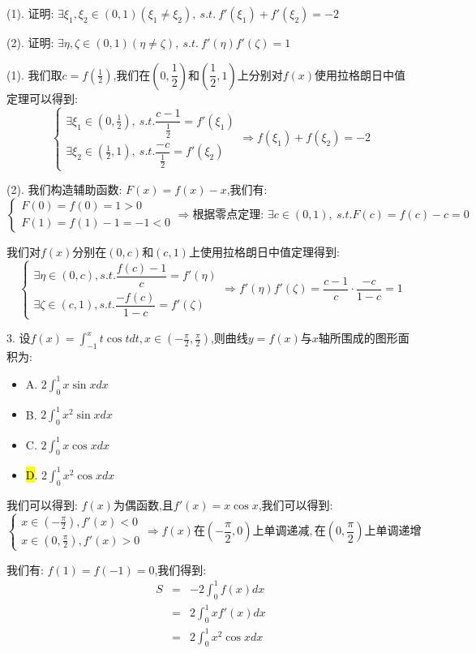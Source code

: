 (1). 证明:  $\exists \xi_{1},\xi_{2}\in(0,1)(\xi_{1}\neq \xi_{2}),\ s.t.\ f'(\xi_{1})+f'(\xi_{2})=-2$

(2). 证明:  $\exists \eta,\zeta\in(0,1)(\eta\neq \zeta),\ s.t.\ f'(\eta)f'(\zeta)=1$
\begin{solution}

	(1). 我们取$c=f(\frac{1}{2})$,我们在$(0,\dfrac{1}{2})$和$(\dfrac{1}{2},1)$上分别对$f(x)$使用拉格朗日中值定理可以得到:  
	$$\left\lbrace
	\begin{array}{l}
		\exists \xi_{1}\in(0,\frac{1}{2}),\ s.t. \dfrac{c-1}{\frac{1}{2}}=f'(\xi_{1})\\
		\exists \xi_{2}\in(\frac{1}{2},1),\ s.t. \dfrac{-c}{\frac{1}{2}}=f'(\xi_{2})
	\end{array}
	\right.\Rightarrow f(\xi_{1})+f(\xi_{2})=-2$$
	
	(2). 我们构造辅助函数:  $F(x)=f(x)-x$,我们有:  
	$$\left\lbrace
	\begin{array}{l}
		F(0)=f(0)=1>0\\
		F(1)=f(1)-1=-1<0
	\end{array}
	\right. \Rightarrow \text{根据零点定理:  }\exists c\in(0,1),\ s.t. F(c)=f(c)-c=0$$
	
	我们对$f(x)$分别在$(0,c)$和$(c,1)$上使用拉格朗日中值定理得到:  
	$$\left\lbrace
	\begin{array}{l}
		\exists\eta\in(0,c),s.t. \dfrac{f(c)-1}{c}=f'(\eta)\\
		\exists\zeta\in(c,1),s.t. \dfrac{-f(c)}{1-c}=f'(\zeta)
	\end{array}
	\right. \Rightarrow f'(\eta)f'(\zeta)=\dfrac{c-1}{c}\cdot\dfrac{-c}{1-c}=1$$
\end{solution}

3. 设$f(x)=\int_{-1}^{x}t\cos tdt,x\in(-\frac{\pi}{2},\frac{\pi}{2})$,则曲线$y=f(x)$与$x$轴所围成的图形面积为:  
\begin{itemize}
	\item A. $2\int_{0}^{1}x\sin xdx$
	\item B. $2\int_{0}^{1}x^2\sin xdx$
	\item C. $2\int_{0}^{1}x\cos xdx$
	\item \hl{D}. $2\int_{0}^{1}x^2\cos xdx$
\end{itemize}
\begin{solution}

	我们可以得到:  $f(x)$为偶函数,且$f'(x)=x\cos x$,我们可以得到:  
	$$\left\lbrace
	\begin{array}{l}
		x\in(-\frac{\pi}{2}),f'(x)<0\\
		x\in(0,\frac{\pi}{2}),f'(x)>0
	\end{array}
	\right. \Rightarrow f(x)\text{在}(-\frac{\pi}{2},0)\text{上单调递减},\text{在}(0,\frac{\pi}{2})\text{上单调递增}$$
	
	我们有:  $f(1)=f(-1)=0$,我们得到:  
	\begin{eqnarray*}
		S&=&-2\int_{0}^{1}f(x)dx\\
		&=&2\int_{0}^{1}xf'(x)dx\\
		&=&2\int_{0}^{1}x^2\cos xdx
	\end{eqnarray*}
\end{solution}

